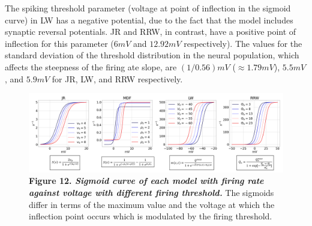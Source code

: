 \documentclass[12pt,twoside]{article}
\begin{document}
The spiking threshold parameter (voltage at point of inflection in the sigmoid curve) in LW has a negative potential, due to the fact that the model includes synaptic reversal potentials. JR and RRW, in contrast, have a positive point of inflection for this parameter ($6mV$ and $12.92mV$ respectively). The values for the standard deviation of the threshold distribution in the neural population, which affects the steepness of the firing ate slope, are $(1/0.56)mV$ ($\approx 1.79mV$), $5.5mV$, and $5.9mV$ for JR, LW, and RRW respectively.  



\begin{figure}[H]
    \hspace{-0.5cm}
    \includegraphics[scale=0.3]{Images/Sigmoid_3_1.png}
    \caption*{\textbf{Figure 12.  \textit{Sigmoid curve of each model with firing rate against voltage with different firing threshold.}} The sigmoids differ in terms of the maximum value and the voltage at which the inflection point occurs which is modulated by the firing threshold.}     
    \label{fig:JR_Sigmoid}
\end{figure}

\vspace{-1cm}
\end{document}
